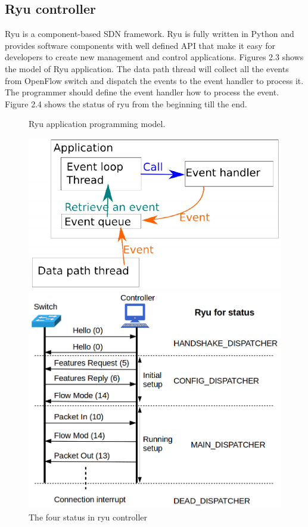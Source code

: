 \documentclass[a4paper,12pt]{report}
\begin{document}
\begin{large}
     \section{Ryu controller}
     \qquad Ryu is a component-based SDN framework. Ryu is fully written in Python and provides software components with well defined API that make it easy for developers to create new management and control applications. Figures 2.3 shows the model of Ryu application. The data path thread will collect all the events from OpenFlow switch and dispatch the events to the event handler to process it. The programmer should define the event handler how to process the event. Figure 2.4 shows the status of ryu from the beginning till the end.  
     \begin{figure}
          \caption{Ryu application programming model.}
          \centering
            \includegraphics[width=1.0\textwidth]{ryu_model.png}
          \caption{The four status in ryu controller}
          	\includegraphics[width=1.0\textwidth]{ryu_graph.png}
      	\end{figure}

\end{large}
\end{document}
